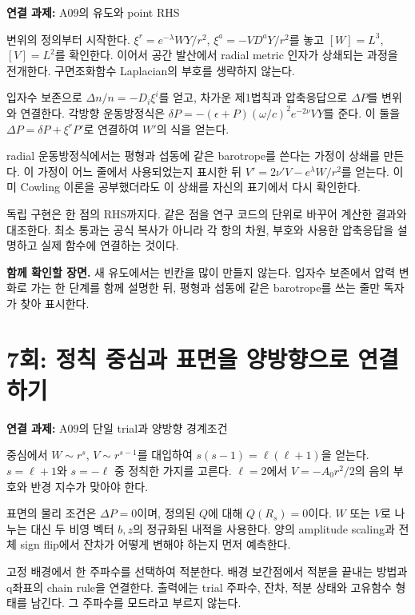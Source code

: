 \documentclass[
  10pt,
  a4paper,
]{article}
\begin{document}
\textbf{연결 과제:} A09의 유도와 point RHS

변위의 정의부터 시작한다. \(\xi^r=e^{-\lambda}WY/r^2\),
\(\xi^a=-VD^aY/r^2\)를 놓고 \([W]=L^3\), \([V]=L^2\)를 확인한다. 이어서
공간 발산에서 radial metric 인자가 상쇄되는 과정을 전개한다.
구면조화함수 Laplacian의 부호를 생략하지 않는다.

입자수 보존으로 \(\Delta n/n=-D_i\xi^i\)를 얻고, 차가운 제1법칙과
압축응답으로 \(\Delta P\)를 변위와 연결한다. 각방향 운동방정식은
\(\delta P=-(\epsilon+P)(\omega/c)^2e^{-2\nu}VY\)를 준다. 이 둘을
\(\Delta P=\delta P+\xi^rP'\)로 연결하여 \(W'\)의 식을 얻는다.

radial 운동방정식에서는 평형과 섭동에 같은 barotrope를 쓴다는 가정이
상쇄를 만든다. 이 가정이 어느 줄에서 사용되었는지 표시한 뒤
\(V'=2\nu'V-e^\lambda W/r^2\)를 얻는다. 이미 Cowling 이론을 공부했더라도
이 상쇄를 자신의 표기에서 다시 확인한다.

독립 구현은 한 점의 RHS까지다. 같은 점을 연구 코드의 단위로 바꾸어
계산한 결과와 대조한다. 최소 통과는 공식 복사가 아니라 각 항의 차원,
부호와 사용한 압축응답을 설명하고 실제 함수에 연결하는 것이다.

\textbf{함께 확인할 장면.} 새 유도에서는 빈칸을 많이 만들지 않는다.
입자수 보존에서 압력 변화로 가는 한 단계를 함께 설명한 뒤, 평형과 섭동에
같은 barotrope를 쓰는 줄만 독자가 찾아 표시한다.

\section{7회: 정칙 중심과 표면을 양방향으로
연결하기}\label{uxd68c-uxc815uxce59-uxc911uxc2ecuxacfc-uxd45cuxba74uxc744-uxc591uxbc29uxd5a5uxc73cuxb85c-uxc5f0uxacb0uxd558uxae30}

\textbf{연결 과제:} A09의 단일 trial과 양방향 경계조건

중심에서 \(W\sim r^s\), \(V\sim r^{s-1}\)를 대입하여
\(s(s-1)=\ell(\ell+1)\)을 얻는다. \(s=\ell+1\)와 \(s=-\ell\) 중 정칙한
가지를 고른다. \(\ell=2\)에서 \(V=-A_0r^2/2\)의 음의 부호와 반경 지수가
맞아야 한다.

표면의 물리 조건은 \(\Delta P=0\)이며, 정의된 \(Q\)에 대해
\(Q(R_s)=0\)이다. \(W\) 또는 \(V\)로 나누는 대신 두 비영 벡터 \(b,z\)의
정규화된 내적을 사용한다. 양의 amplitude scaling과 전체 sign flip에서
잔차가 어떻게 변해야 하는지 먼저 예측한다.

고정 배경에서 한 주파수를 선택하여 적분한다. 배경 보간점에서 적분을
끝내는 방법과 q좌표의 chain rule을 연결한다. 출력에는 trial 주파수,
잔차, 적분 상태와 고유함수 형태를 남긴다. 그 주파수를 모드라고 부르지
않는다.
\end{document}
